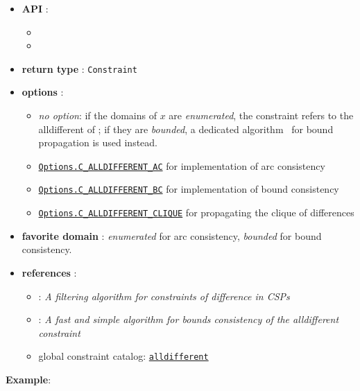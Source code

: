\begin{itemize}
	\item \textbf{API} :
	\begin{itemize}
		\item {}
		\item {}
	\end{itemize}
	\item \textbf{return type} : \texttt{Constraint}
	\item \textbf{options} :
	\begin{itemize}
		\item \emph{no option}: if the domains of $x$ are \emph{enumerated}, the constraint refers to the alldifferent of \cite{ReginAAAI94};
if they are \emph{bounded}, a dedicated algorithm~\cite{LopezIJCAI03} for bound propagation is used instead. 
		\item \hyperlink{calldiffac:calldiffacoptions}{\tt Options.C\_ALLDIFFERENT\_AC} for \cite{ReginAAAI94} implementation of arc consistency
		\item \hyperlink{calldiffbc:calldiffbcoptions}{\tt Options.C\_ALLDIFFERENT\_BC} for \cite{LopezIJCAI03} implementation of bound consistency
		\item \hyperlink{calldiffclique:calldiffcliqueoptions}{\tt Options.C\_ALLDIFFERENT\_CLIQUE} for propagating the clique of differences
	\end{itemize}
	\item \textbf{favorite domain} : \emph{enumerated} for arc consistency, \emph{bounded} for bound consistency.
	\item \textbf{references} :
      \begin{itemize}
      \item  \cite{ReginAAAI94}: \emph{A filtering algorithm for constraints of difference in CSPs}
      \item  \cite{LopezIJCAI03}: \emph{A fast and simple algorithm for bounds consistency of the alldifferent constraint}
      \item global constraint catalog: \href{http://www.emn.fr/x-info/sdemasse/gccat/Calldifferent.html}{\tt alldifferent}
      \end{itemize}
\end{itemize}



\textbf{Example}:

